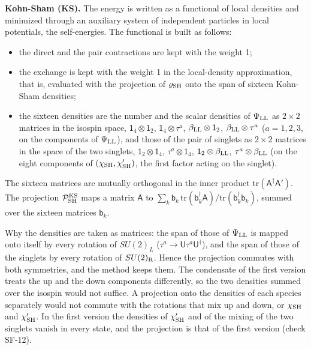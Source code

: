 \documentclass[
  10pt,
]{article}
\providecommand{\tightlist}{%
  \setlength{\itemsep}{0pt}\setlength{\parskip}{0pt}}
\begin{document}
\textbf{Kohn-Sham (KS).} The energy is written as a functional of local
densities and minimized through an auxiliary system of independent
particles in local potentials, the self-energies. The functional is
built as follows:

\begin{itemize}
\tightlist
\item
  the direct and the pair contractions are kept with the weight 1;
\item
  the exchange is kept with the weight 1 in the local-density
  approximation, that is, evaluated with the projection of
  \(\varrho_{\rm SH}\) onto the span of sixteen Kohn-Sham densities;
\item
  the sixteen densities are the number and the scalar densities of
  \(\Psi_{\rm LL}\) as \(2\times2\) matrices in the isospin space,
  \(\mathsf 1_4\otimes\mathsf 1_2\), \(\mathsf 1_4\otimes\tau^a\),
  \(\beta_{\rm LL}\otimes\mathsf 1_2\), \(\beta_{\rm LL}\otimes\tau^a\)
  (\(a=1,2,3\), on the components of \(\Psi_{\rm LL}\)), and those of
  the pair of singlets as \(2\times2\) matrices in the space of the two
  singlets, \(\mathsf 1_2\otimes\mathsf 1_4\),
  \(\tau^a\otimes\mathsf 1_4\), \(\mathsf 1_2\otimes\beta_{\rm LL}\),
  \(\tau^a\otimes\beta_{\rm LL}\) (on the eight components of
  \((\chi_{\rm SH},\chi'_{\rm SH})\), the first factor acting on the
  singlet).
\end{itemize}

The sixteen matrices are mutually orthogonal in the inner product
\(\mathrm{tr}(\mathsf A^\dagger\mathsf A')\). The projection
\(\mathcal P^{\rm KS}_{\rm SH}\) maps a matrix \(\mathsf A\) to
\(\sum_k\mathsf b_k\,\mathrm{tr}(\mathsf b_k^\dagger\mathsf A)/\mathrm{tr}(\mathsf b_k^\dagger\mathsf b_k)\),
summed over the sixteen matrices \(\mathsf b_k\).

Why the densities are taken as matrices: the span of those of
\(\Psi_{\rm LL}\) is mapped onto itself by every rotation of \(SU(2)_L\)
(\(\tau^a\to\mathsf U\tau^a\mathsf U^\dagger\)), and the span of those
of the singlets by every rotation of \(SU(2)_{\rm R}\). Hence the
projection commutes with both symmetries, and the method keeps them. The
condensate of the first version treats the up and the down components
differently, so the two densities summed over the isospin would not
suffice. A projection onto the densities of each species separately
would not commute with the rotations that mix up and down, or
\(\chi_{\rm SH}\) and \(\chi'_{\rm SH}\). In the first version the
densities of \(\chi'_{\rm SH}\) and of the mixing of the two singlets
vanish in every state, and the projection is that of the first version
(check SF-12).
\end{document}
